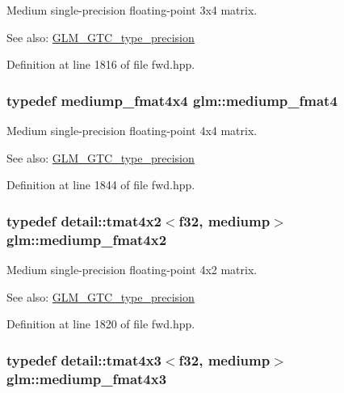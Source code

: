 Medium single-precision floating-point 3x4 matrix. \begin{Desc}
\item[See also:]\hyperlink{group__gtc__type__precision}{GLM\_\-GTC\_\-type\_\-precision} \end{Desc}


Definition at line 1816 of file fwd.hpp.\hypertarget{group__gtc__type__precision_g6cd3ae1f3509b79061edcc83564769d4}{
\subsubsection[mediump\_\-fmat4]{\setlength{\rightskip}{0pt plus 5cm}typedef mediump\_\-fmat4x4 {\bf glm::mediump\_\-fmat4}}}
\label{group__gtc__type__precision_g6cd3ae1f3509b79061edcc83564769d4}


Medium single-precision floating-point 4x4 matrix. \begin{Desc}
\item[See also:]\hyperlink{group__gtc__type__precision}{GLM\_\-GTC\_\-type\_\-precision} \end{Desc}


Definition at line 1844 of file fwd.hpp.\hypertarget{group__gtc__type__precision_g09a2851d38fe3cf52735a1d26199bdcc}{
\subsubsection[mediump\_\-fmat4x2]{\setlength{\rightskip}{0pt plus 5cm}typedef detail::tmat4x2$<$f32, mediump$>$ {\bf glm::mediump\_\-fmat4x2}}}
\label{group__gtc__type__precision_g09a2851d38fe3cf52735a1d26199bdcc}


Medium single-precision floating-point 4x2 matrix. \begin{Desc}
\item[See also:]\hyperlink{group__gtc__type__precision}{GLM\_\-GTC\_\-type\_\-precision} \end{Desc}


Definition at line 1820 of file fwd.hpp.\hypertarget{group__gtc__type__precision_g5e5de428d1e1da2c593a6245d92dd8c0}{
\subsubsection[mediump\_\-fmat4x3]{\setlength{\rightskip}{0pt plus 5cm}typedef detail::tmat4x3$<$f32, mediump$>$ {\bf glm::mediump\_\-fmat4x3}}}
\label{group__gtc__type__precision_g5e5de428d1e1da2c593a6245d92dd8c0}


